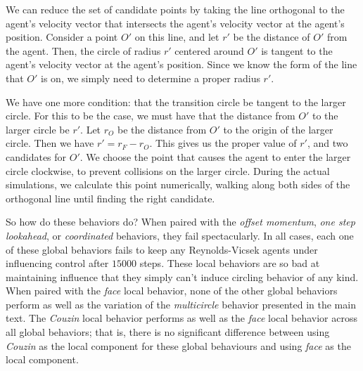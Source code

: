 We can reduce the set of candidate points by taking the line orthogonal to the
agent's velocity vector that intersects the agent's velocity vector at the
agent's position.
Consider a point $O'$ on this line, and let $r'$ be the distance of
$O'$ from the agent.
Then, the circle of radius $r'$ centered around $O'$ is tangent to
the agent's velocity vector at the agent's position.
Since we know the form of the line that $O'$ is on, we simply need to
determine a proper radius $r'$.

We have one more condition: that the transition circle be tangent to the larger
circle.
For this to be the case, we must have that the distance from $O'$ to the
larger circle be $r'$.
Let $r_{O}$ be the distance from $O'$ to the origin of the larger circle.
Then we have $r' = r_F - r_{O}$.
This gives us the proper value of $r'$, and two candidates for $O'$.
We choose the point that causes the agent to enter the larger circle clockwise,
to prevent collisions on the larger circle.
During the actual simulations, we calculate this point numerically, walking
along both sides of the orthogonal line until finding the right candidate.

So how do these behaviors do?
When paired with the \textit{offset momentum}, \textit{one step lookahead}, or
\textit{coordinated} behaviors, they fail spectacularly.
In all cases, each one of these global behaviors fails to keep any
Reynolds-Vicsek agents under influencing control after $15000$ steps.
These local behaviors are so bad at maintaining influence that they simply
can't induce circling behavior of any kind.
When paired with the \textit{face} local behavior, none of the other global
behaviors perform as well as the variation of the \textit{multicircle} behavior
presented in the main text.
The \textit{Couzin} local behavior performs as well as the \textit{face} local
behavior across all global behaviors; that is, there is no significant
difference between using \textit{Couzin} as the local component for these
global behaviours and using \textit{face} as the local component.

